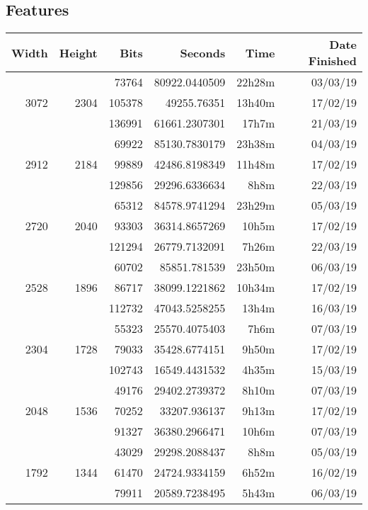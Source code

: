 \subsection{Features}
  \begin{center}
  \begin{tabular}{ r r r | r r r }
  Width & Height & Bits & Seconds & Time & Date Finished \\ \hline
  \multirow{3}{*}{3072} & \multirow{3}{*}{2304} & 73764 & 80922.0440509 & 22h28m & 03/03/19 \\
  & & 105378 & 49255.76351 & 13h40m & 17/02/19 \\
  & & 136991 & 61661.2307301 & 17h7m & 21/03/19 \\
  \hline
  \multirow{3}{*}{2912} & \multirow{3}{*}{2184} & 69922 & 85130.7830179 & 23h38m & 04/03/19 \\
  & & 99889 & 42486.8198349 & 11h48m & 17/02/19 \\
  & & 129856 & 29296.6336634 & 8h8m & 22/03/19 \\
  \hline
  \multirow{3}{*}{2720} & \multirow{3}{*}{2040} & 65312 & 84578.9741294 & 23h29m & 05/03/19 \\
  & & 93303 & 36314.8657269 & 10h5m & 17/02/19 \\
  & & 121294 & 26779.7132091 & 7h26m & 22/03/19 \\
  \hline
  \multirow{3}{*}{2528} & \multirow{3}{*}{1896} & 60702 & 85851.781539 & 23h50m & 06/03/19 \\
  & & 86717 & 38099.1221862 & 10h34m & 17/02/19 \\
  & & 112732 & 47043.5258255 & 13h4m & 16/03/19 \\
  \hline
  \multirow{3}{*}{2304} & \multirow{3}{*}{1728} & 55323 & 25570.4075403 & 7h6m & 07/03/19 \\
  & & 79033 & 35428.6774151 & 9h50m & 17/02/19 \\
  & & 102743 & 16549.4431532 & 4h35m & 15/03/19 \\
  \hline
  \multirow{3}{*}{2048} & \multirow{3}{*}{1536} & 49176 & 29402.2739372 & 8h10m & 07/03/19 \\
  & & 70252 & 33207.936137 & 9h13m & 17/02/19 \\
  & & 91327 & 36380.2966471 & 10h6m & 07/03/19 \\
  \hline
  \multirow{3}{*}{1792} & \multirow{3}{*}{1344} & 43029 & 29298.2088437 & 8h8m & 05/03/19 \\
  & & 61470 & 24724.9334159 & 6h52m & 16/02/19 \\
  & & 79911 & 20589.7238495 & 5h43m & 06/03/19 \\

\end{tabular}
\end{center}
